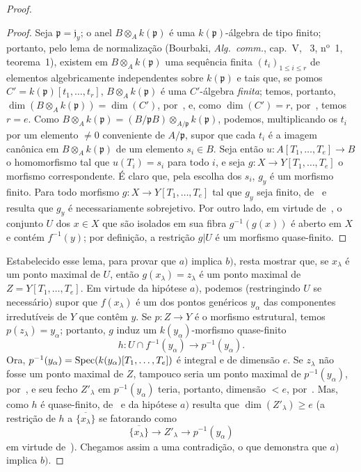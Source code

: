 \begin{proof}
\begin{proof}
Seja $\mathfrak{p}=\mathfrak{j}_y$; o anel
$B\otimes_A k(\mathfrak{p})$ é uma $k(\mathfrak{p})$-álgebra de tipo finito;
portanto, pelo lema de normalização (Bourbaki, \emph{Alg.\ comm.}, cap.~V,
\textsection~3, n$^{\text{o}}$~1, teorema~1), existem em
$B\otimes_A k(\mathfrak{p})$ uma sequência finita $(t_i)_{1\leq i\leq r}$
de elementos algebricamente independentes sobre $k(\mathfrak{p})$ e tais
que, se pomos $C'=k(\mathfrak{p})[t_1,\ldots,t_r]$,
$B\otimes_A k(\mathfrak{p})$ é uma $C'$-álgebra \emph{finita}; temos, portanto,
$\dim(B\otimes_A k(\mathfrak{p}))=\dim(C')$, por~,
e, como $\dim(C')=r$, por~, temos $r=e$.
Como $B\otimes_A k(\mathfrak{p})=(B/\mathfrak{p}B)\otimes_{A/\mathfrak{p}}k(\mathfrak{p})$,
podemos, multiplicando os $t_i$ por um elemento $\neq0$
conveniente de $A/\mathfrak{p}$, supor que cada $t_i$ é a imagem canônica
em $B\otimes_A k(\mathfrak{p})$ de um elemento $s_i\in B$.
Seja então $u:A[T_1,\ldots,T_e]\to B$ o homomorfismo tal que $u(T_i)=s_i$
para todo $i$, e seja $g:X\to Y[T_1,\ldots,T_e]$ o morfismo correspondente.
É claro que, pela escolha dos $s_i$, $g_y$ é um morfismo finito.
Para todo morfismo $g:X\to Y[T_1,\ldots,T_e]$ tal que $g_y$ seja finito,
de~ e~ resulta que $g_y$ é necessariamente
sobrejetivo.
Por outro lado, em virtude de~, o conjunto $U$ dos $x\in X$
que são isolados em sua fibra $g^{-1}(g(x))$ é aberto em $X$ e contém
$f^{-1}(y)$; por definição, a restrição $g|U$ é um morfismo quase-finito.
\end{proof}

Estabelecido esse lema, para provar que $a)$ implica $b)$, resta mostrar
que, se $x_\lambda$ é um ponto maximal de $U$, então
$g(x_\lambda)=z_\lambda$ é um ponto maximal de $Z=Y[T_1,\ldots,T_e]$.
Em virtude da hipótese $a)$, podemos (restringindo $U$ se necessário) supor
que $f(x_\lambda)$ é um dos pontos genéricos $y_\alpha$ das componentes
irredutíveis de $Y$ que contêm $y$.
Se $p:Z\to Y$ é o morfismo estrutural, temos $p(z_\lambda)=y_\alpha$;
portanto, $g$ induz um $k(y_\alpha)$-morfismo quase-finito
\[
h:U\cap f^{-1}(y_\alpha)\longrightarrow p^{-1}(y_\alpha).
\]
Ora, $p^{-1}(y_\alpha)=\operatorname{Spec}(k(y_\alpha)[T_1,\ldots,T_e])$ é integral e de
dimensão $e$.
Se $z_\lambda$ não fosse um ponto maximal de $Z$, tampouco seria um ponto
maximal de $p^{-1}(y_\alpha)$, por~, e seu fecho
$Z'_\lambda$ em $p^{-1}(y_\alpha)$ teria, portanto, dimensão $<e$,
por~.
Mas, como $h$ é quase-finito, de~ e da hipótese $a)$ resulta
que $\dim(Z'_\lambda)\geq e$ (a restrição de $h$ a
$\overline{\{x_\lambda\}}$ se fatorando como
\[
\overline{\{x_\lambda\}}\longrightarrow Z'_\lambda\longrightarrow p^{-1}(y_\alpha)
\]
em virtude de~).
Chegamos assim a uma contradição, o que demonstra que $a)$ implica $b)$.


\end{proof}
